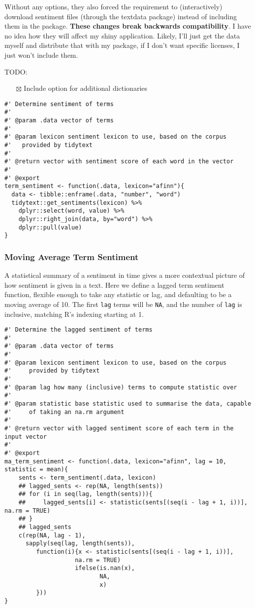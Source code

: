 \documentclass[a4paper, 11pt]{article}
\begin{document}
Without any options, they also forced the requirement to
(interactively) download sentiment files (through the textdata
package) instead of including them in the package. \textbf{These changes
break backwards compatibility}. I have no idea how they will affect my
shiny application. Likely, I'll just get the data myself and
distribute that with my package, if I don't want specific licenses, I
just won't include them.

TODO:
\begin{itemize}
\item[{$\boxtimes$}] Include option for additional dictionaries
\end{itemize}
\begin{verbatim}
#' Determine sentiment of terms
#'
#' @param .data vector of terms
#'
#' @param lexicon sentiment lexicon to use, based on the corpus
#'   provided by tidytext
#' 
#' @return vector with sentiment score of each word in the vector
#'
#' @export
term_sentiment <- function(.data, lexicon="afinn"){
  data <- tibble::enframe(.data, "number", "word")
  tidytext::get_sentiments(lexicon) %>%
    dplyr::select(word, value) %>%
    dplyr::right_join(data, by="word") %>%
    dplyr::pull(value)
}
\end{verbatim}
\subsubsection{Moving Average Term Sentiment}
\label{sec:org2579eee}

A statistical summary of a sentiment in time gives a more contextual
picture of how sentiment is given in a text. Here we define a lagged
term sentiment function, flexible enough to take any statistic or lag,
and defaulting to be a moving average of 10. The first \texttt{lag} terms
will be \texttt{NA}, and the number of \texttt{lag} is inclusive, matching R's
indexing starting at 1.

\begin{verbatim}
#' Determine the lagged sentiment of terms
#'
#' @param .data vector of terms
#'
#' @param lexicon sentiment lexicon to use, based on the corpus
#'     provided by tidytext
#'
#' @param lag how many (inclusive) terms to compute statistic over
#'
#' @param statistic base statistic used to summarise the data, capable
#'     of taking an na.rm argument
#'
#' @return vector with lagged sentiment score of each term in the input vector
#'
#' @export
ma_term_sentiment <- function(.data, lexicon="afinn", lag = 10, statistic = mean){
    sents <- term_sentiment(.data, lexicon)
    ## lagged_sents <- rep(NA, length(sents))
    ## for (i in seq(lag, length(sents))){
    ##     lagged_sents[i] <- statistic(sents[(seq(i - lag + 1, i))], na.rm = TRUE)
    ## }
    ## lagged_sents
    c(rep(NA, lag - 1),
      sapply(seq(lag, length(sents)),
	     function(i){x <- statistic(sents[(seq(i - lag + 1, i))],
					na.rm = TRUE)
					ifelse(is.nan(x),
					       NA,
					       x)
	     }))
}
\end{verbatim}
\end{document}

